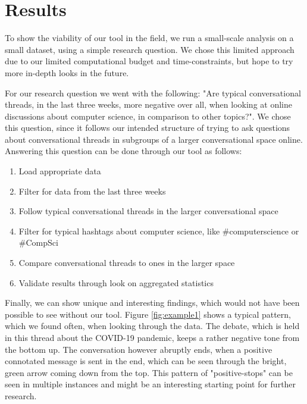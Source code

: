 \chapter{Results}
\label{chap:Results}

To show the viability of our tool in the field, we run a small-scale analysis on a small dataset, using a simple research question. We chose this limited approach due to our limited computational budget and time-constraints, but hope to try more in-depth looks in the future. 

For our research question we went with the following: "Are typical conversational threads, in the last three weeks, more negative over all, when looking at online discussions about computer science, in comparison to other topics?". We chose this question, since it follows our intended structure of trying to ask questions about conversational threads in subgroups of a larger conversational space online. Answering this question can be done through our tool as follows:
\begin{enumerate}
    \item Load appropriate data
    \item Filter for data from the last three weeks
    \item Follow typical conversational threads in the larger conversational space
    \item Filter for typical hashtags about computer science, like #computerscience or #CompSci
    \item Compare conversational threads to ones in the larger space
    \item Validate results through look on aggregated statistics
\end{enumerate} 


Finally, we can show unique and interesting findings, which would not have been possible to see without our tool. Figure \ref{fig:example1} shows a typical pattern, which we found often, when looking through the data. The debate, which is held in this thread about the COVID-19 pandemic, keeps a rather negative tone from the bottom up. The conversation however abruptly ends, when a positive connotated message is sent in the end, which can be seen through the bright, green arrow coming down from the top. This pattern of "positive-stops" can be seen in multiple instances and might be an interesting starting point for further research.

